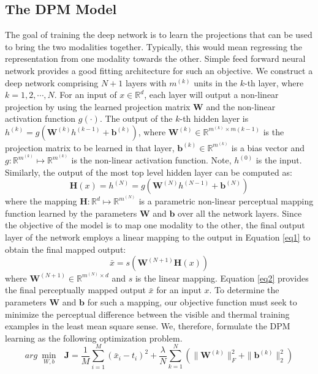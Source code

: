 \documentclass[smallextended,natbib]{svjour3}       \usepackage{graphicx}
\begin{document}
\subsection{The DPM Model}
The goal of training the deep network is to learn the projections that can be used to bring the two modalities together. Typically, this would mean regressing the representation from one modality towards the other. Simple feed forward neural network provides a good fitting architecture for such an objective. We construct a deep network comprising $N+1$ layers with $m^{(k)}$ units in the $k$-th layer, where $k=1, 2, \cdots, N$. For an input of $x\in \mathbb{R}^{d}$, each layer will output a non-linear projection by using the learned projection matrix $\mathbf{W}$ and the non-linear activation function $g(\cdot)$. The output of the $k$-th hidden layer is $h^{(k)}=g(\mathbf{W}^{(k)}h^{(k-1)}+\mathbf{b}^{(k)})$, where $\mathbf{W}^{(k)}\in \mathbb{R}^{m^{(k)} \times m{(k-1)}}$ is the projection matrix to be learned in that layer, $\mathbf{b}^{(k)}\in \mathbb{R}^{m^{(k)}}$ is a bias vector and $g:\mathbb{R}^{m^{(k)}} \mapsto \mathbb{R}^{m^{(k)}}$ is the non-linear activation function. Note, $h^{(0)}$ is the input. Similarly, the output of the most top level hidden layer can be computed as:
\begin{equation}
\label{eq1}
\mathbf{H}(x)=h^{(N)}=g(\mathbf{W}^{(N)}h^{(N-1)}+\mathbf{b}^{(N)})
\end{equation}
where the mapping $\mathbf{H}:\mathbb{R}^{d} \mapsto \mathbb{R}^{m^{(N)}}$ is a parametric non-linear perceptual mapping function learned by the parameters $\mathbf{W}$ and $\mathbf{b}$ over all the network layers.
Since the objective of the model is to map one modality to the other, the final output layer of the network employs a linear mapping to the output in Equation \ref{eq1} to  obtain the final mapped output:
\begin{equation}
\label{eq2}
\bar{x}=s(\mathbf{W}^{(N+1)}\mathbf{H}(x))
\end{equation}
where $\mathbf{W}^{(N+1)} \in \mathbb{R}^{m^{(N)} \times d}$ and $s$ is the linear mapping. Equation \ref{eq2} provides the final perceptually mapped output $\bar{x}$ for an input $x$.
To determine the parameters $\mathbf{W}$ and $\mathbf{b}$ for such a mapping, our objective function must seek to minimize the perceptual difference between the visible and thermal training examples in the least mean square sense. We, therefore, formulate the DPM learning as the following optimization problem.
\begin{equation}
\label{eq3}
arg ~ \min_{W,b} ~~~ \mathbf{J}=\frac{1}{M}\sum_{i=1}^M (\bar{x}_i - t_i)^2 + \frac{\lambda}{N} \sum_{k=1}^N(\|\mathbf{W}^{(k)}\|_F^2 + \|\mathbf{b}^{(k)}\|_2^2) 
\end{equation}
\end{document}
